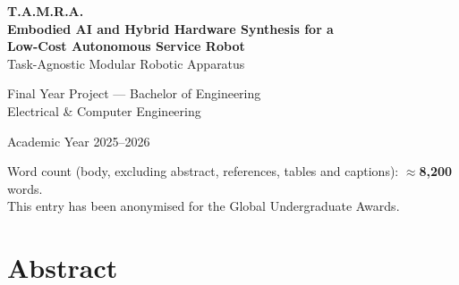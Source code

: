\documentclass[11pt,a4paper]{article}
\begin{document}
\begin{titlepage}
\centering
\vspace*{3cm}

{\Huge\textbf{T.A.M.R.A.}}\\[0.5cm]
{\LARGE\textbf{Embodied AI and Hybrid Hardware Synthesis for a\\[0.2cm] Low-Cost Autonomous Service Robot}}\\[1.0cm]
{\large Task-Agnostic Modular Robotic Apparatus}

\vspace{2.5cm}

{\large Final Year Project --- Bachelor of Engineering}\\[0.3cm]
{\normalsize Electrical \& Computer Engineering}

\vspace{1.5cm}

{\normalsize Academic Year 2025--2026}

\vfill

{\small Word count (body, excluding abstract, references, tables and captions): \textbf{$\approx$8{,}200} words.}\\
{\small This entry has been anonymised for the Global Undergraduate Awards.}

\end{titlepage}

\newpage
\thispagestyle{empty}
\section*{Abstract}
\end{document}
